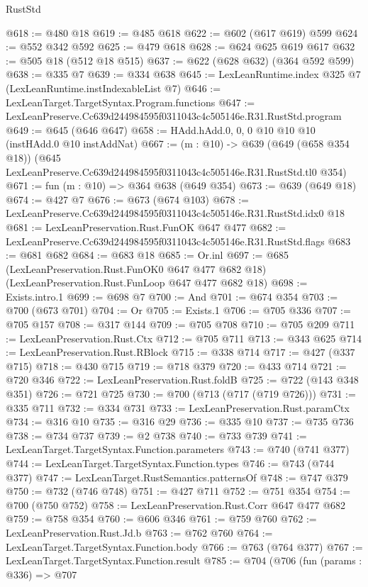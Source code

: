 \begin{lexlean}{RustStd}
\begin{coremodule}
@618 := @480 @18
@619 := @485 @618
@622 := @602 (@617 @619) @599
@624 := @552 @342 @592
@625 := @479 @618
@628 := @624 @625 @619 @617
@632 := @505 @18 (@512 @18 @515)
@637 := @622 (@628 @632) (@364 @592 @599)
@638 := @335 @7
@639 := @334 @638
@645 := LexLeanRuntime.index @325 @7 (LexLeanRuntime.instIndexableList @7)
@646 := LexLeanTarget.TargetSyntax.Program.functions
@647 := LexLeanPreserve.Cc639d244984595f0311043c4c505146e.R31.RustStd.program
@649 := @645 (@646 @647)
@658 := HAdd.hAdd.{0, 0, 0} @10 @10 @10 (instHAdd.{0} @10 instAddNat)
@667 := (m : @10) ->
  @639
    (@649 (@658 @354 @18))
    (@645 LexLeanPreserve.Cc639d244984595f0311043c4c505146e.R31.RustStd.tl0 @354)
@671 := fun (m : @10) => @364 @638 (@649 @354)
@673 := @639 (@649 @18)
@674 := @427 @7
@676 := @673 (@674 @103)
@678 := LexLeanPreserve.Cc639d244984595f0311043c4c505146e.R31.RustStd.idx0 @18
@681 := LexLeanPreservation.Rust.FunOK @647 @477
@682 := LexLeanPreserve.Cc639d244984595f0311043c4c505146e.R31.RustStd.flags
@683 := @681 @682
@684 := @683 @18
@685 := Or.inl
@697 := @685
    (LexLeanPreservation.Rust.FunOK0 @647 @477 @682 @18)
    (LexLeanPreservation.Rust.FunLoop @647 @477 @682 @18)
@698 := Exists.intro.{1}
@699 := @698 @7
@700 := And
@701 := @674 @354
@703 := @700 (@673 @701)
@704 := Or
@705 := Exists.{1}
@706 := @705 @336
@707 := @705 @157
@708 := @317 @144
@709 := @705 @708
@710 := @705 @209
@711 := LexLeanPreservation.Rust.Ctx
@712 := @705 @711
@713 := @343 @625
@714 := LexLeanPreservation.Rust.RBlock
@715 := @338 @714
@717 := @427 (@337 @715)
@718 := @430 @715
@719 := @718 @379
@720 := @433 @714
@721 := @720 @346
@722 := LexLeanPreservation.Rust.foldB
@725 := @722 (@143 @348 @351)
@726 := @721 @725
@730 := @700 (@713 (@717 (@719 @726)))
@731 := @335 @711
@732 := @334 @731
@733 := LexLeanPreservation.Rust.paramCtx
@734 := @316 @10
@735 := @316 @29
@736 := @335 @10
@737 := @735 @736
@738 := @734 @737
@739 := @2 @738
@740 := @733 @739
@741 := LexLeanTarget.TargetSyntax.Function.parameters
@743 := @740 (@741 @377)
@744 := LexLeanTarget.TargetSyntax.Function.types
@746 := @743 (@744 @377)
@747 := LexLeanTarget.RustSemantics.patternsOf
@748 := @747 @379
@750 := @732 (@746 @748)
@751 := @427 @711
@752 := @751 @354
@754 := @700 (@750 @752)
@758 := LexLeanPreservation.Rust.Corr @647 @477 @682
@759 := @758 @354
@760 := @606 @346
@761 := @759 @760
@762 := LexLeanPreservation.Rust.Jd.b
@763 := @762 @760
@764 := LexLeanTarget.TargetSyntax.Function.body
@766 := @763 (@764 @377)
@767 := LexLeanTarget.TargetSyntax.Function.result
@785 := @704
    (@706
      (fun (params : @336) =>
      @707

\end{coremodule}
\end{lexlean}
